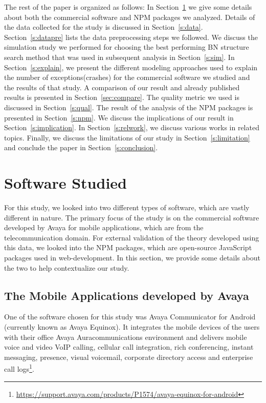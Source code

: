 \documentclass[smallextended]{svjour3}       %
\begin{document}
The rest of the paper is organized as follows: In Section~\ref{s:soft} we give some details about both the commercial software and NPM packages we analyzed. Details of the data collected for the study is discussed in Section~\ref{s:data}. Section~\ref{s:datapre} lists the data preprocessing steps we followed. We discuss the simulation study we performed for choosing the best performing BN structure search method that was used in subsequent analysis in Section~\ref{s:sim}. In Section~\ref{s:explain}, we present the different modeling approaches used to explain the number of exceptions(crashes) for the commercial software we studied and the results of that study. A comparison of our result and already published results is presented in Section~\ref{sec:compare}. 
The quality metric we used is discussed in Section~\ref{s:qual}. The result of the analysis of the NPM packages is presented in Section~\ref{s:npm}. We discuss the implications of our result in Section~\ref{s:implication}.  In Section~\ref{s:relwork}, we discuss various works in related topics. Finally, we discuss the limitations of our study in Section~\ref{s:limitation} and conclude the paper in Section~\ref{s:conclusion}.  

\section{Software Studied}\label{s:soft}

For this study, we looked into two different types of software, which are vastly different in nature. The primary focus of the study is on the commercial software developed by Avaya for mobile applications, which are from the telecommunication domain. For external validation of the theory developed using this data, we looked into the NPM packages, which are open-source JavaScript packages used in web-development. In this section, we provide some details about the two to help contextualize our study.

\vspace{-10pt}
\subsection{The Mobile Applications developed by Avaya}
One of the software chosen for this study was Avaya Communicator for
Android (currently known as Avaya Equinox\textregistered ). It
integrates the mobile devices of the users with their office Avaya
Aura\textregistered communications environment and delivers mobile
voice and video VoIP calling, cellular call integration, rich
conferencing, instant messaging, presence, visual voicemail,
corporate directory access and enterprise call logs\footnote{\url{https://support.avaya.com/products/P1574/avaya-equinox-for-android}}.
\end{document}
